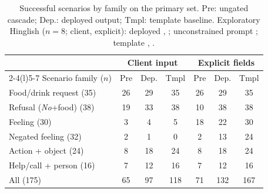 \begin{table}[t]
\centering\footnotesize
\setlength{\tabcolsep}{2.6pt}
\begin{tabular}{@{}lcccccc@{}}
\toprule
 & \multicolumn{3}{c}{Client input} & \multicolumn{3}{c}{Explicit fields} \\
\cmidrule(lr){2-4}\cmidrule(l){5-7}
Scenario family ($n$) & Pre & Dep. & Tmpl & Pre & Dep. & Tmpl \\
\midrule
Food/drink request (35) & 26 & 29 & 35 & 26 & 29 & 35 \\
Refusal (\emph{No}+food) (38) & 19 & 33 & 38 & 10 & 38 & 38 \\
Feeling (30) & 3 & 4 & 5 & 18 & 22 & 30 \\
Negated feeling (32) & 2 & 1 & 0 & 2 & 13 & 24 \\
Action + object (24) & 8 & 18 & 24 & 8 & 18 & 24 \\
Help/call + person (16) & 7 & 12 & 16 & 7 & 12 & 16 \\
\midrule
All (175) & 65 & 97 & 118 & 71 & 132 & 167 \\
\bottomrule
\end{tabular}
\caption{Successful scenarios by family on the primary set. Pre: ungated cascade; Dep.: deployed output; Tmpl: template baseline. Exploratory Hinglish ($n=8$; client, explicit): deployed \CMSuccDepU{}, \CMSuccDepS{}; unconstrained prompt \CMSuccNaive{}; template \CMSuccTmplU{}, \CMSuccTmplS{}.}
\label{tab:type}
\end{table}
